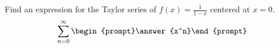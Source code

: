 \documentclass{ximera}
\author{Gregory Hartman \and Matthew Carr}
\begin{document}
\begin{exercise}






Find an expression for the Taylor series of $f(x)=\frac{1}{1-x}$ centered at $x=0$.
\[
\sum_{n=0}^{\infty}\begin{prompt}\answer{x^n}\end{prompt}
\]

\end{exercise}
\end{document}
